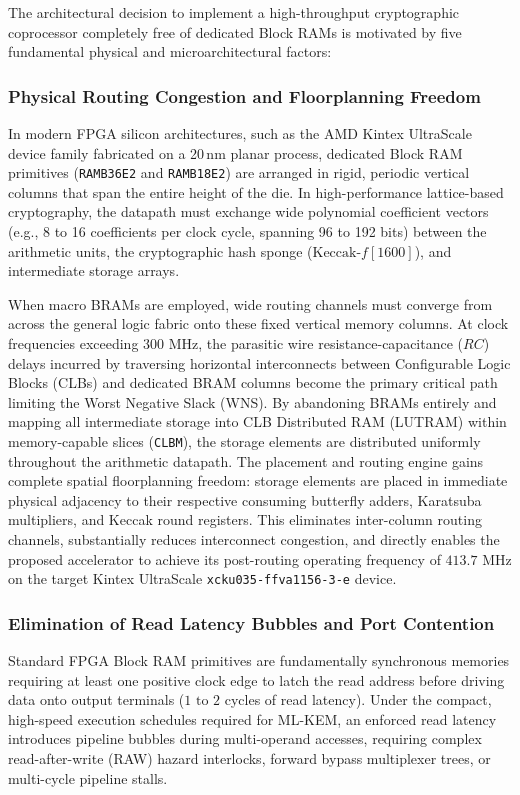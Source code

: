The architectural decision to implement a high-throughput cryptographic coprocessor completely free of dedicated Block RAMs is motivated by five fundamental physical and microarchitectural factors:

\subsubsection{Physical Routing Congestion and Floorplanning Freedom}
In modern FPGA silicon architectures, such as the AMD Kintex UltraScale device family fabricated on a 20\,nm planar process, dedicated Block RAM primitives (\texttt{RAMB36E2} and \texttt{RAMB18E2}) are arranged in rigid, periodic vertical columns that span the entire height of the die. In high-performance lattice-based cryptography, the datapath must exchange wide polynomial coefficient vectors (e.g., 8 to 16 coefficients per clock cycle, spanning 96 to 192 bits) between the arithmetic units, the cryptographic hash sponge ($\text{Keccak-}f[1600]$), and intermediate storage arrays.

When macro BRAMs are employed, wide routing channels must converge from across the general logic fabric onto these fixed vertical memory columns. At clock frequencies exceeding $300\text{ MHz}$, the parasitic wire resistance-capacitance ($RC$) delays incurred by traversing horizontal interconnects between Configurable Logic Blocks (CLBs) and dedicated BRAM columns become the primary critical path limiting the Worst Negative Slack (WNS). By abandoning BRAMs entirely and mapping all intermediate storage into CLB Distributed RAM (LUTRAM) within memory-capable slices (\texttt{CLBM}), the storage elements are distributed uniformly throughout the arithmetic datapath. The placement and routing engine gains complete spatial floorplanning freedom: storage elements are placed in immediate physical adjacency to their respective consuming butterfly adders, Karatsuba multipliers, and Keccak round registers. This eliminates inter-column routing channels, substantially reduces interconnect congestion, and directly enables the proposed accelerator to achieve its post-routing operating frequency of $413.7\text{ MHz}$ on the target Kintex UltraScale \texttt{xcku035-ffva1156-3-e} device.

\subsubsection{Elimination of Read Latency Bubbles and Port Contention}
Standard FPGA Block RAM primitives are fundamentally synchronous memories requiring at least one positive clock edge to latch the read address before driving data onto output terminals ($1\text{ to }2$ cycles of read latency). Under the compact, high-speed execution schedules required for \mbox{ML-KEM}, an enforced read latency introduces pipeline bubbles during multi-operand accesses, requiring complex read-after-write (RAW) hazard interlocks, forward bypass multiplexer trees, or multi-cycle pipeline stalls.

